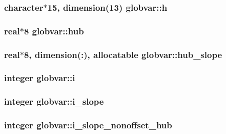 \subsubsection[{h}]{\setlength{\rightskip}{0pt plus 5cm}character$\ast$15, dimension(13) globvar\+::h}\label{namespaceglobvar_a05ffe1b752c11acb73ba6f8a4a854e94}
\hypertarget{namespaceglobvar_afe5a2fb0a1ae94505f2ade324addffd6}{}
\subsubsection[{hub}]{\setlength{\rightskip}{0pt plus 5cm}real$\ast$8 globvar\+::hub}\label{namespaceglobvar_afe5a2fb0a1ae94505f2ade324addffd6}
\hypertarget{namespaceglobvar_ae3e1714c3ebebc9e95b28edd32df9f8e}{}
\subsubsection[{hub\+\_\+slope}]{\setlength{\rightskip}{0pt plus 5cm}real$\ast$8, dimension(\+:), allocatable globvar\+::hub\+\_\+slope}\label{namespaceglobvar_ae3e1714c3ebebc9e95b28edd32df9f8e}
\hypertarget{namespaceglobvar_a9b05c54fac739f587c870e529b2216f9}{}
\subsubsection[{i}]{\setlength{\rightskip}{0pt plus 5cm}integer globvar\+::i}\label{namespaceglobvar_a9b05c54fac739f587c870e529b2216f9}
\hypertarget{namespaceglobvar_aa918e1748c88e365a2bc9905e000fab4}{}
\subsubsection[{i\+\_\+slope}]{\setlength{\rightskip}{0pt plus 5cm}integer globvar\+::i\+\_\+slope}\label{namespaceglobvar_aa918e1748c88e365a2bc9905e000fab4}
\hypertarget{namespaceglobvar_a605576db34c829b3b1cdb2d8d549c1d3}{}
\subsubsection[{i\+\_\+slope\+\_\+nonoffset\+\_\+hub}]{\setlength{\rightskip}{0pt plus 5cm}integer globvar\+::i\+\_\+slope\+\_\+nonoffset\+\_\+hub}\label{namespaceglobvar_a605576db34c829b3b1cdb2d8d549c1d3}
\hypertarget{namespaceglobvar_ae4e17de7f28c6c5fa62413a151e30d71}{}
